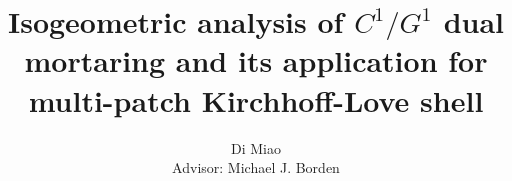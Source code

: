 \documentclass[preprint,12pt]{elsarticle}
\theoremstyle{remark}
\begin{document}
\graphicspath{{./img/}} 

\begin{frontmatter}


\title{Isogeometric analysis of $C^1/G^1$ dual mortaring and its application for multi-patch Kirchhoff-Love shell}




\author{Di Miao\\[1cm]{\small Advisor: Michael J. Borden}}
\address{Department of Civil and Environmental Engineering\\
Brigham Young University\\
368 CB, Provo, UT 84602, USA\\}





\end{frontmatter}
\end{document}

